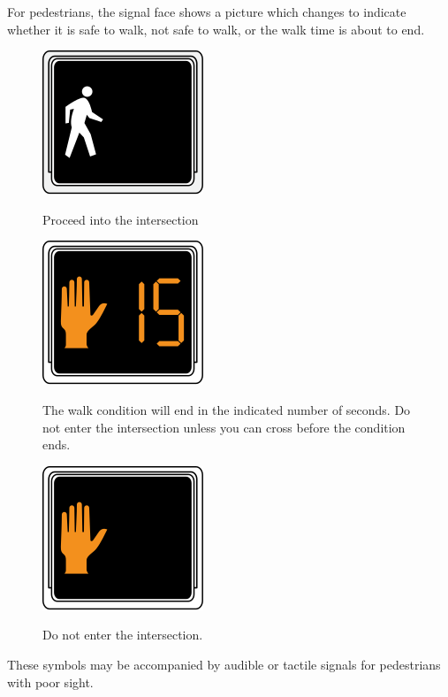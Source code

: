 \documentclass[letterpaper,twoside]{article}
\begin{document}
For pedestrians, the signal face shows a picture which changes to indicate
whether it is safe to walk, not safe to walk, or the walk time is about to end.

\begin{figure}[H]
  \fcapside
           {\includegraphics{MUTCD_Ped_Signal_-_Walk}}
           {\caption{Proceed into the intersection}}
\end{figure}

\begin{figure}[H]
  \fcapside
           {\includegraphics{MUTCD_Ped_Signal_-_Hand_with_timer}}
           {\caption{The walk condition will end in the indicated
               number of seconds.  Do not enter the intersection
               unless you can cross before the condition ends.}}
\end{figure}

\begin{figure}[H]
  \fcapside
           {\includegraphics{MUTCD_Ped_Signal_-_Steady_hand}}
           {\caption{Do not enter the intersection.}}
\end{figure}

These symbols may be accompanied by audible or tactile signals for
pedestrians with poor sight.
\end{document}
